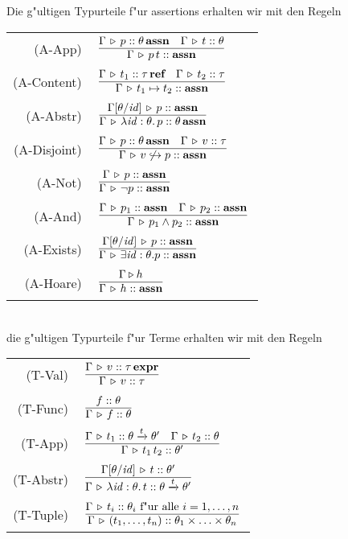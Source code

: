 \documentclass[12pt,a4paper,bigheadings]{scrartcl}
\newcommand{\assn}{\ensuremath{\mathbf{assn}}}
\newcommand{\atype}[1]{#1\,\assn}
\newcommand{\bexpr}{\ensuremath{\mathbf{expr}}}
\newcommand{\etype}[1]{#1\,\bexpr}
\newcommand{\tto}{\ensuremath{\xrightarrow{t}}}
\renewcommand{\disjoint}[2]{\ensuremath{#2\not\hookrightarrow#1}}
\newcommand{\RN}[1]{\mbox{{\sc (#1)}}}
\begin{document}
Die g"ultigen Typurteile f"ur assertions erhalten wir mit den Regeln \\[3mm]
\begin{tabular}{rl}
  \RN{A-App} & $\regel{\Tj{\Gamma}{p}{\atype{\theta}} \quad \Tj{\Gamma}{t}{\theta}}
                      {\Tj{\Gamma}{\app{p}{t}}{\assn}}$ \\[1mm]
  \RN{A-Content} & $\regel{\Tj{\Gamma}{t_1}{\reftype{\tau}} \quad \Tj{\Gamma}{t_2}{\tau}}
                          {\Tj{\Gamma}{t_1 \mapsto t_2}{\assn}}$ \\[1mm]
  \RN{A-Abstr} & $\regel{\Tj{\Gamma[\theta/\id]}{p}{\assn}}
                        {\Tj{\Gamma}{\abstr{\id:\theta}{p}}{\atype{\theta}}}$ \\[1mm]
  \RN{A-Disjoint} & $\regel{\Tj{\Gamma}{p}{\atype{\theta}} \quad \Tj{\Gamma}{v}{\tau}}
                           {\Tj{\Gamma}{\disjoint{p}{v}}{\assn}}$ \\[1mm]
  \RN{A-Not} & $\regel{\Tj{\Gamma}{p}{\assn}}
                      {\Tj{\Gamma}{\neg p}{\assn}}$ \\[1mm]
  \RN{A-And} & $\regel{\Tj{\Gamma}{p_1}{\assn} \quad \Tj{\Gamma}{p_2}{\assn}}
                      {\Tj{\Gamma}{p_1 \wedge p_2}{\assn}}$ \\[1mm]
  \RN{A-Exists} & $\regel{\Tj{\Gamma[\theta/\id]}{p}{\assn}}
                         {\Tj{\Gamma}{\exists \id:\theta.p}{\assn}}$ \\[1mm]
  \RN{A-Hoare} & $\regel{\Tjh{\Gamma}{h}}
                        {\Tj{\Gamma}{h}{\assn}}$
\end{tabular} \\[3mm]
die g"ultigen Typurteile f"ur Terme erhalten wir mit den Regeln \\[3mm]
\begin{tabular}{rl}
  \RN{T-Val} & $\regel{\Tj{\Gamma}{v}{\etype{\tau}}}
                      {\Tj{\Gamma}{v}{\tau}}$ \\[1mm]
  \RN{T-Func} & $\regel{\tj{f}{\theta}}
                       {\Tj{\Gamma}{f}{\theta}}$ \\[1mm]
  \RN{T-App} & $\regel{\Tj{\Gamma}{t_1}{\theta \tto \theta'} \quad \Tj{\Gamma}{t_2}{\theta}}
                      {\Tj{\Gamma}{\app{t_1}{t_2}}{\theta'}}$ \\[1mm]
  \RN{T-Abstr} & $\regel{\Tj{\Gamma[\theta/\id]}{t}{\theta'}}
                        {\Tj{\Gamma}{\abstr{\id:\theta}{t}}{\theta \tto \theta'}}$ \\[1mm]
  \RN{T-Tuple} & $\regel{\Tj{\Gamma}{t_i}{\theta_i} \text{ f"ur alle } i=1,\ldots,n}
                        {\Tj{\Gamma}{(t_1,\ldots,t_n)}{\theta_1\times\ldots\times\theta_n}}$
\end{tabular} \\[3mm]
\end{document}
